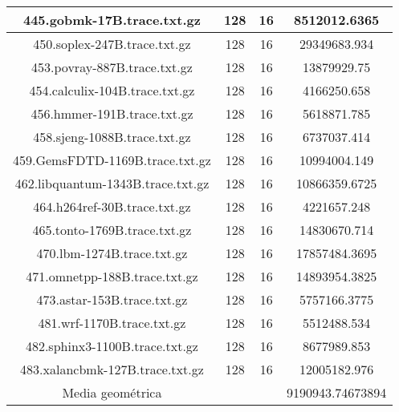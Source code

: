 \begin{table}[H]
\begin{center}
{\begin{tabular}{|c|c|c|c|}
		445.gobmk-17B.trace.txt.gz	&	128	&	16	&	8512012.6365	\\
		\hline
		450.soplex-247B.trace.txt.gz	&	128	&	16	&	29349683.934	\\
		\hline
		453.povray-887B.trace.txt.gz	&	128	&	16	&	13879929.75	\\
		\hline
		454.calculix-104B.trace.txt.gz	&	128	&	16	&	4166250.658	\\
		\hline
		456.hmmer-191B.trace.txt.gz	&	128	&	16	&	5618871.785	\\
		\hline
		458.sjeng-1088B.trace.txt.gz	&	128	&	16	&	6737037.414	\\
		\hline
		459.GemsFDTD-1169B.trace.txt.gz	&	128	&	16	&	10994004.149	\\
		\hline
		462.libquantum-1343B.trace.txt.gz	&	128	&	16	&	10866359.6725	\\
		\hline
		464.h264ref-30B.trace.txt.gz	&	128	&	16	&	4221657.248	\\
		\hline
		465.tonto-1769B.trace.txt.gz	&	128	&	16	&	14830670.714	\\
		\hline
		470.lbm-1274B.trace.txt.gz	&	128	&	16	&	17857484.3695	\\
		\hline
		471.omnetpp-188B.trace.txt.gz	&	128	&	16	&	14893954.3825	\\
		\hline
		473.astar-153B.trace.txt.gz	&	128	&	16	&	5757166.3775	\\
		\hline
		481.wrf-1170B.trace.txt.gz	&	128	&	16	&	5512488.534	\\
		\hline
		482.sphinx3-1100B.trace.txt.gz	&	128	&	16	&	8677989.853	\\
		\hline
		483.xalancbmk-127B.trace.txt.gz	&	128	&	16	&	12005182.976	\\
		\hline
		\hline
		Media	geométrica	&		&	&	9190943.74673894	\\
		\hline
	\end{tabular}%
}
\end{center}
\end{table}


